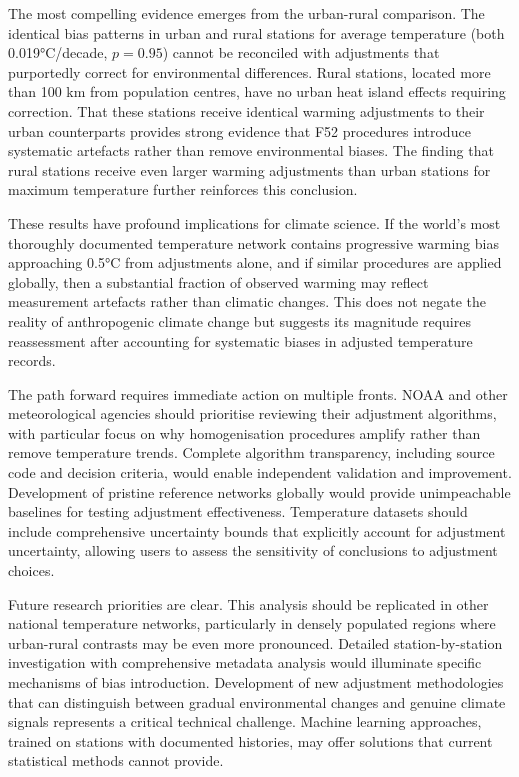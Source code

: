 \documentclass[11pt, a4paper]{article}
\begin{document}
The most compelling evidence emerges from the urban-rural comparison. The identical bias patterns in urban and rural stations for average temperature (both 0.019°C/decade, $p = 0.95$) cannot be reconciled with adjustments that purportedly correct for environmental differences. Rural stations, located more than 100 km from population centres, have no urban heat island effects requiring correction. That these stations receive identical warming adjustments to their urban counterparts provides strong evidence that F52 procedures introduce systematic artefacts rather than remove environmental biases. The finding that rural stations receive even larger warming adjustments than urban stations for maximum temperature further reinforces this conclusion.

These results have profound implications for climate science. If the world's most thoroughly documented temperature network contains progressive warming bias approaching 0.5°C from adjustments alone, and if similar procedures are applied globally, then a substantial fraction of observed warming may reflect measurement artefacts rather than climatic changes. This does not negate the reality of anthropogenic climate change but suggests its magnitude requires reassessment after accounting for systematic biases in adjusted temperature records.

The path forward requires immediate action on multiple fronts. NOAA and other meteorological agencies should prioritise reviewing their adjustment algorithms, with particular focus on why homogenisation procedures amplify rather than remove temperature trends. Complete algorithm transparency, including source code and decision criteria, would enable independent validation and improvement. Development of pristine reference networks globally would provide unimpeachable baselines for testing adjustment effectiveness. Temperature datasets should include comprehensive uncertainty bounds that explicitly account for adjustment uncertainty, allowing users to assess the sensitivity of conclusions to adjustment choices.

Future research priorities are clear. This analysis should be replicated in other national temperature networks, particularly in densely populated regions where urban-rural contrasts may be even more pronounced. Detailed station-by-station investigation with comprehensive metadata analysis would illuminate specific mechanisms of bias introduction. Development of new adjustment methodologies that can distinguish between gradual environmental changes and genuine climate signals represents a critical technical challenge. Machine learning approaches, trained on stations with documented histories, may offer solutions that current statistical methods cannot provide.
\end{document}
